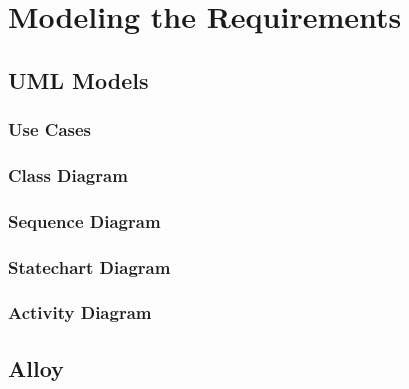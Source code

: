 \documentclass[11pt,a4paper]{report}
\begin{document}
\chapter{Modeling the Requirements}

\section{UML Models}

\subsection{Use Cases}
\subsection{Class Diagram}
\subsection{Sequence Diagram}
\subsection{Statechart Diagram}
\subsection{Activity Diagram}
\section{Alloy}
\end{document}
